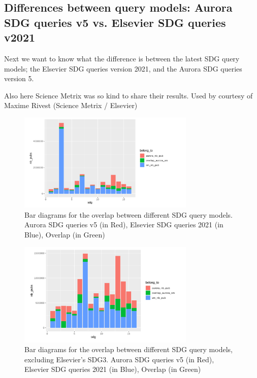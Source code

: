 \documentclass{article}
\begin{document}
\subsection{Differences between query models: Aurora SDG queries v5 vs. Elsevier SDG queries v2021}

Next we want to know what the difference is between the latest SDG query models; the Elsevier SDG queries version 2021, and the Aurora SDG queries version 5.

Also here Science Metrix was so kind to share their results.
Used by courtesy of Maxime Rivest (Science Metrix / Elsevier)

\begin{figure}[H]
	\centering
  \includegraphics[width=0.75\textwidth]{figures/aurora-elsevier-venn/overlap-aurora-elsevier-absolutes.png}
	\caption{Bar diagrams for the overlap between different SDG query models.  Aurora SDG queries v5 (in Red), Elsevier SDG queries 2021 (in Blue), Overlap (in Green)}
\end{figure}

\begin{figure}[H]
	\centering
  \includegraphics[width=0.75\textwidth]{figures/aurora-elsevier-venn/overlap-aurora-elsevier-absolutes2.png}
	\caption{Bar diagrams for the overlap between different SDG query models, excluding Elsevier's SDG3. Aurora SDG queries v5 (in Red), Elsevier SDG queries 2021 (in Blue), Overlap (in Green)}
\end{figure}
\end{document}
